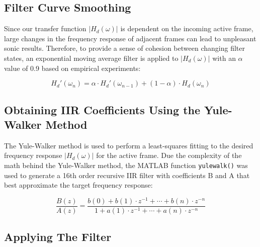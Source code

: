 \documentclass{article}
\begin{document}
\subsection{Filter Curve Smoothing}
\label{subsec:Filter Curve Smoothing}

Since our transfer function $|H_d(\omega)|$ is dependent on the incoming active frame, large changes in the frequency response of adjacent frames can lead to unpleasant sonic results.  Therefore, to provide a sense of cohesion between changing filter states, an exponential moving average filter is applied to $|H_d(\omega)|$ with an $\alpha$ value of 0.9 based on empirical experiments:

\begin{equation}
\label{eq:EMAFILTERCURVE}
H_d'(\omega_{n}) = \alpha \cdot H_d'(\omega_{n-1}) + (1-\alpha) \cdot H_d(\omega_{n})
\end{equation}

\subsection{Obtaining IIR Coefficients Using the Yule-Walker Method}
\label{subsec:Obtaining IIR Coefficients Using the Yule-Walker Method}

The Yule-Walker method \cite{friedlander1984modified} is used to perform a least-squares fitting to the desired frequency response $|H_d(\omega)|$ for the active frame.  Due the complexity of the math behind the Yule-Walker method, the MATLAB function \texttt{yulewalk()} was used to generate a 16th order recursive IIR filter with coefficients B and A that best approximate the target frequency response:

\begin{equation}
\label{eq:IIRfilter1}
\frac{B(z)}{A(z)} = \frac{b(0) + b(1) \cdot z^{-1} + \cdots + b(n) \cdot z^{-n}}{1 + a(1) \cdot z^{-1} + \cdots + a(n) \cdot z^{-n}}
\end{equation}

\subsection{Applying The Filter}
\label{subsec:Applying The Filter}
\end{document}

